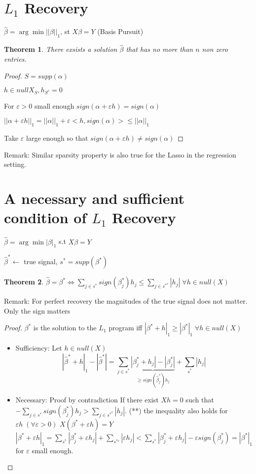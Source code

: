 \documentclass[11pt]{article}
\newtheorem{theorem}{Theorem}
\begin{document}
\section{\(L_1\) Recovery}
\label{sec:orgheadline3}
\(\hat \beta = \arg \min ||\beta||_1\), st \(X\beta = Y\) (Basis Pursuit)

\begin{theorem}
There exsists a solution \(\hat \beta\) that has no more than \(n\) non zero entries.
\end{theorem}

\begin{proof}
\(S = supp(\alpha)\)

\(h \in null X_S, h_{S^c} = 0\)

For \(\varepsilon > 0\) small enough \(sign(\alpha + \varepsilon h) = sign(\alpha)\)

\(||\alpha + \varepsilon h||_1 = ||\alpha||_1  + \varepsilon <h, sign(\alpha)> \le ||\alpha||_1\)

Take \(\varepsilon\) large enough so that \(sign(\alpha + \varepsilon h) \ne sign(\alpha)\)
\end{proof}

Remark: Similar sparsity property is also true for the Lasso in
the regression setting.

\section{A necessary and sufficient condition of \(L_1\) Recovery}
\label{sec:orgheadline4}
\(\hat \beta = \arg \min |\beta|_1\) s.t \(X \beta = Y\)

\(\hat \beta^* \leftarrow\) true signal, \(s^* = supp(\beta^*)\)

\begin{theorem}
\(\hat \beta = \beta^* \iff \sum_{j \in s^*} sign(\beta_j^*) h_j \le \sum_{j \in {s^*}^c} |h_j| \; \forall h \in null(X)\)
\end{theorem}
Remark: For perfect recovery the magnitudes of the true signal does not matter. Only the sign matters

\begin{proof}
\(\beta^*\) is the solution to the \(L_1\) program iff \(|\beta^* + h|_1 \ge |\beta^*|_1 \; \forall h \in null(X)\)

\begin{itemize}
\item Sufficiency: Let \(h \in null(X)\)
$$|\hat \beta^* + h | _1 - | \hat \beta^* | = \sum_{j \in s^*} \underbrace{|\beta_j^* + h_j| - |\beta_j^*|}_{ \ge sign(\hat \beta^*_j) h_j} + \sum_{s^*} |h_j|$$
\item Necessary: Proof by contradiction
If there exist \(Xh = 0\) such that \(-\sum_{j \in s^*} sign(\beta_j^*) h_j > \sum_{j \in {s^*}^c} |h_j|\). (**)
the inequality also holds for \(\varepsilon h \; (\forall \varepsilon > 0)\)
\(X(\beta^* + \varepsilon h) = Y\)
\(|\beta^* + \varepsilon h|_1 = \sum_{s^*} |\beta_j^* + \varepsilon h_j| + \sum_{s^{* c}} |\varepsilon h_j| < \sum_{s^*} |\beta_j^* + \varepsilon h_j| - \varepsilon sign(\beta_j^*) = |\beta^*|_1\) for \(\varepsilon\) small enough.
\end{itemize}
\end{proof}
\end{document}
